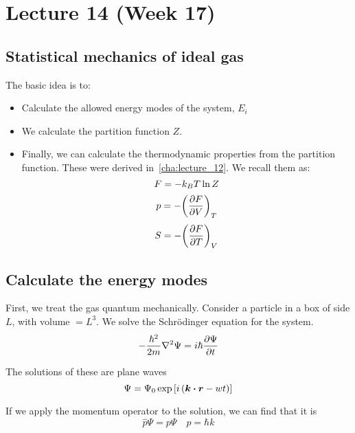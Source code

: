\documentclass[12pt,chapterprefix=false,dvipsnames]{scrbook}
\theoremstyle{dotless}
\theoremstyle{definition}
\def\vec#1{{\ensuremath{\bm{{#1}}}}}
\begin{document}
\chapter{Lecture 14 (Week 17)}%
\label{cha:lecture_14}

\section{Statistical mechanics of ideal gas}%
\label{sec:statistical_mechanics_of_ideal_gas}

The basic idea is to:
\begin{itemize}
	\item Calculate the allowed energy modes of the system,
	      $E_i$
	\item We calculate the partition function $Z$.
	\item Finally, we can calculate the thermodynamic properties from the
	      partition function. These were derived
	      in~\ref{cha:lecture_12}. We recall them as:
	      \begin{equation}
		      F = -k_B T \naturallogarithm{Z}
	      \end{equation}
	      \begin{equation}
		      p = -{\left(\pdv{F}{V}\right)}_{T}
	      \end{equation}
	      \begin{equation}
		      S = -{\left(\pdv{F}{T}\right)}_{V}
	      \end{equation}
\end{itemize}

\section{Calculate the energy modes}%
\label{sec:calculate_the_energy_modes}

First, we treat the gas quantum mechanically. Consider a
particle in a box of side $L$, with volume
$ = L^3 $. We solve the Schrödinger equation for
the system.
\begin{equation}
	\label{eq:schrodingers_equation}
	-\frac{\hbar^2}{2m} \laplacian \Psi =
	i\hbar \pdv{\Psi}{t}
\end{equation}

The solutions of these are plane waves
\begin{equation}
	\Psi
	=
	\Psi_0 \exponential\left[i\left(\vec{k} \vdot \vec{r} - wt\right)\right]
\end{equation}

If we apply the momentum operator to the solution, we can find
that it is
\begin{equation}
	\hat{p}\Psi
	=
	p\Psi \hspace{1em} p = \hbar k
\end{equation}
\end{document}
